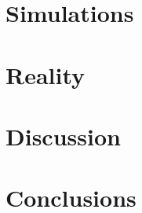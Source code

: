 \documentclass[doublespace,draft,nopageskip]{VTthesis} %
\begin{document}
	\chapter{Simulations} \label{ch:simulations}



	\chapter{} \label{ch:simulations}
    
	\chapter{Reality} \label{ch:reality}
	\chapter{Discussion} \label{ch:discussion}
	\chapter{Conclusions} \label{ch:conclusions}

\end{document}
